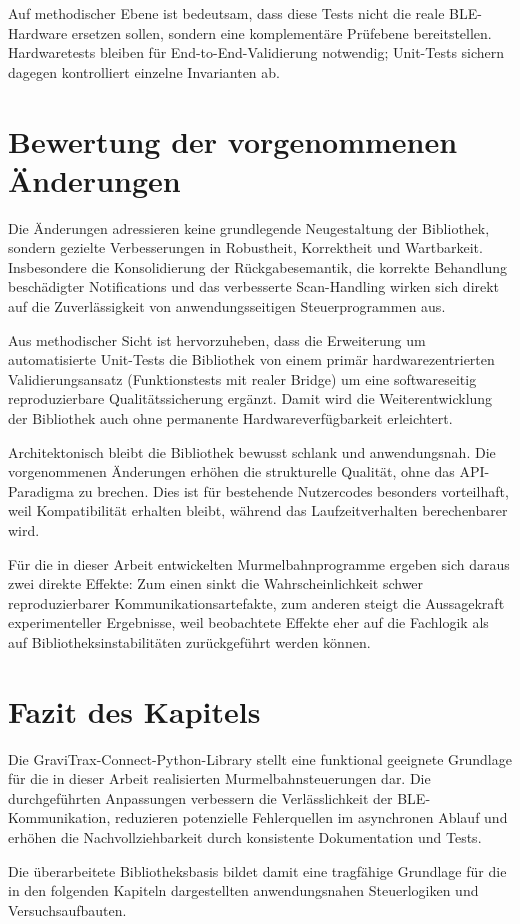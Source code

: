 Auf methodischer Ebene ist bedeutsam, dass diese Tests nicht die reale BLE-Hardware ersetzen sollen, sondern eine komplementäre Prüfebene bereitstellen.
Hardwaretests bleiben für End-to-End-Validierung notwendig; Unit-Tests sichern dagegen kontrolliert einzelne Invarianten ab.

\section{Bewertung der vorgenommenen Änderungen}
Die Änderungen adressieren keine grundlegende Neugestaltung der Bibliothek, sondern gezielte Verbesserungen in Robustheit, Korrektheit und Wartbarkeit.
Insbesondere die Konsolidierung der Rückgabesemantik, die korrekte Behandlung beschädigter Notifications und das verbesserte Scan-Handling wirken sich direkt auf die Zuverlässigkeit von anwendungsseitigen Steuerprogrammen aus.

Aus methodischer Sicht ist hervorzuheben, dass die Erweiterung um automatisierte Unit-Tests die Bibliothek von einem primär hardwarezentrierten Validierungsansatz (Funktionstests mit realer Bridge) um eine softwareseitig reproduzierbare Qualitätssicherung ergänzt.
Damit wird die Weiterentwicklung der Bibliothek auch ohne permanente Hardwareverfügbarkeit erleichtert.

Architektonisch bleibt die Bibliothek bewusst schlank und anwendungsnah.
Die vorgenommenen Änderungen erhöhen die strukturelle Qualität, ohne das API-Paradigma zu brechen.
Dies ist für bestehende Nutzercodes besonders vorteilhaft, weil Kompatibilität erhalten bleibt, während das Laufzeitverhalten berechenbarer wird.

Für die in dieser Arbeit entwickelten Murmelbahnprogramme ergeben sich daraus zwei direkte Effekte:
Zum einen sinkt die Wahrscheinlichkeit schwer reproduzierbarer Kommunikationsartefakte, zum anderen steigt die Aussagekraft experimenteller Ergebnisse, weil beobachtete Effekte eher auf die Fachlogik als auf Bibliotheksinstabilitäten zurückgeführt werden können.

\section{Fazit des Kapitels}
Die GraviTrax-Connect-Python-Library stellt eine funktional geeignete Grundlage für die in dieser Arbeit realisierten Murmelbahnsteuerungen dar.
Die durchgeführten Anpassungen verbessern die Verlässlichkeit der BLE-Kommunikation, reduzieren potenzielle Fehlerquellen im asynchronen Ablauf und erhöhen die Nachvollziehbarkeit durch konsistente Dokumentation und Tests.

Die überarbeitete Bibliotheksbasis bildet damit eine tragfähige Grundlage für die in den folgenden Kapiteln dargestellten anwendungsnahen Steuerlogiken und Versuchsaufbauten.
